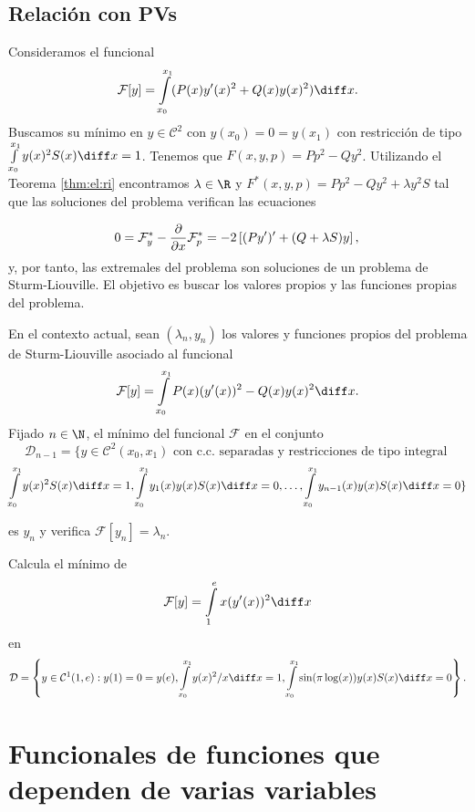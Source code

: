 \documentclass{article}
\begin{document}
\subsection{Relación con PVs}

Consideramos el funcional
\[\mathcal{F}[y] = \int\limits_{x_0}^{x_1} (P(x) y'(x)^2 + Q(x) y(x)^2) \diff x.\]
Buscamos su mínimo en $y \in \mathcal{C}^{2}$ con $y(x_0) = 0 = y(x_1)$ con restricción de tipo
$\int\limits_{x_0}^{x_1}y(x)^2 S(x) \diff x = 1$. Tenemos que $F(x,y,p) = P p^2 - Q y^2$. Utilizando
el Teorema \ref{thm:el:ri} encontramos $\lambda \in \R$ y
$F^{*}(x,y,p) = P p^2 - Q y^2 + \lambda y^2 S$ tal que las soluciones del problema verifican las
ecuaciones

\[
  0 =\mathcal{F}_{y}^* - \frac{\partial}{\partial x} \mathcal{F}_{p}^* = -2 \left[ (P y')' + (Q+\lambda S) y \right], \\
\]
y, por tanto, las extremales del problema son soluciones de un problema de Sturm-Liouville. El
objetivo es buscar los valores propios y las funciones propias del problema.

  \begin{theorem}
    En el contexto actual, sean $(\lambda_n, y_n)$ los valores y funciones propios del problema de
    Sturm-Liouville asociado al funcional
    \[\mathcal{F}[y] = \int\limits_{x_0}^{x_1} P(x)(y'(x))^{2} - Q(x)y(x)^{2} \diff x.\]
    Fijado $n \in \N$, el mínimo del funcional $\mathcal{F}$ en el conjunto
    \[\mathcal{D}_{n-1} = \{y \in \mathcal{C}^{2}(x_0, x_1) \text{ con c.c. separadas y
        restricciones de tipo integral }\]
    \[\int\limits_{x_0}^{x_1}y(x)^2 S(x) \diff x = 1, \int\limits_{x_0}^{x_1}y_1(x) y(x) S(x) \diff
      x = 0, \ldots, \int\limits_{x_0}^{x_1}y_{n-1}(x) y(x) S(x) \diff x = 0 \}\]

    es $y_n$ y verifica $\mathcal{F}[y_n] = \lambda_n$.
  \end{theorem}

  \begin{ex}
    Calcula el mínimo de
    \[\mathcal{F}[y] = \int\limits_{1}^{e} x(y'(x))^2 \diff x\]
    en
    \[\mathcal{D} = \left\{y \in \mathcal{C}^{1}(1, e): y(1) = 0 = y(e), \int\limits_{x_0}^{x_1}y(x)^2
    / x \diff x = 1, \int\limits_{x_0}^{x_1} \sin(\pi \log(x)) y(x) S(x) \diff x = 0 \right\}.\]
  \end{ex}

  \section{Funcionales de funciones que dependen de varias variables}
\end{document}
